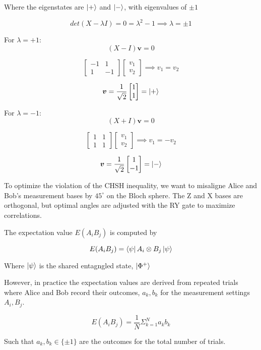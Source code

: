 \documentclass[12pt]{article}
\begin{document}
Where the eigenstates are $\ket{+}$ and $\ket{-}$, with eigenvalues of $\pm1$

$$
det(X-\lambda I) = 0 = \lambda^2 -1 \implies \lambda = \pm 1
$$

For $\lambda = +1$:
$$
(X-I)\boldsymbol{v} = 0 
$$

$$
\begin{bmatrix}
-1 & 1 \\
1 & -1
\end{bmatrix}
\begin{bmatrix}
v_1 \\
v_2
\end{bmatrix} \implies v_1 = v_2
$$

$$
\boldsymbol{v} = \frac{1}{\sqrt{2}}\begin{bmatrix}
1 \\
1
\end{bmatrix} = \ket{+}
$$

For $\lambda = -1$:
$$
(X+I)\boldsymbol{v} = 0 
$$

$$
\begin{bmatrix}
1 & 1 \\
1 & 1
\end{bmatrix}
\begin{bmatrix}
v_1 \\
v_2
\end{bmatrix} \implies v_1 = -v_2
$$

$$
\boldsymbol{v} = \frac{1}{\sqrt{2}}\begin{bmatrix}
1 \\
-1
\end{bmatrix} = \ket{-}
$$

To optimize the violation of the CHSH inequality, we want to misaligne Alice and Bob's measurement bases by $45^\circ$ on the Bloch sphere. The Z and X bases are orthogonal, but optimal angles are adjusted with the RY gate to maximize correlations.

The expectation value $E(A_iB_j)$ is computed by

$$
E(A_i B_j) = \bra{\psi} A_i \otimes B_j \ket{\psi}
$$

Where $\ket{\psi}$ is the shared entagngled state, $\ket{\Phi^+}$

However, in practice the expectation values are derived from repeated trials where Alice and Bob record their outcomes, $a_k,b_k$ for the measurement settings $A_i,B_j$.


$$
E(A_i B_j) = \frac{1}{N} \Sigma_{k=1}^{N} a_k b_k
$$

Such that $a_k, b_k \in \{\pm1\}$ are the outcomes for the total number of trials. 
\end{document}
